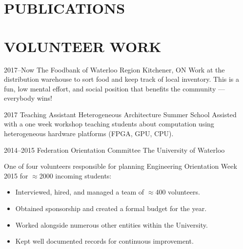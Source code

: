 \documentclass[a4paper,nocolors]{cv-friggeri-ben}
\begin{document}

\section{PUBLICATIONS}

\printallbibsections



\section{VOLUNTEER WORK}

\begin{entrylist}

\entry
    {2017--Now}
    {The Foodbank of Waterloo Region}
    {Kitchener, ON}
    {Work at the distribution warehouse to sort food and keep track of
    local inventory. This is a fun, low mental effort, and social position that
    benefits the community --- everybody wins!}

\entry
    {2017}
    {Teaching Assistant}
    {Heterogeneous Architecture Summer School}
    {Assisted with a one week workshop teaching students about computation using
    heterogeneous hardware platforms (FPGA, GPU, CPU).}

\entry
    {2014--2015}
    {Federation Orientation Committee}
    {The University of Waterloo}
    {One of four volunteers responsible for planning Engineering Orientation
    Week 2015 for $\approx$2000 incoming students:
    \begin{itemize}
        \item Interviewed, hired, and managed a team of $\approx$400 volunteers.
        \item Obtained sponsorship and created a formal budget for the year.
        \item Worked alongside numerous other entities within the University.
        \item Kept well documented records for continuous improvement.
    \end{itemize}}


\end{entrylist}
\end{document}
